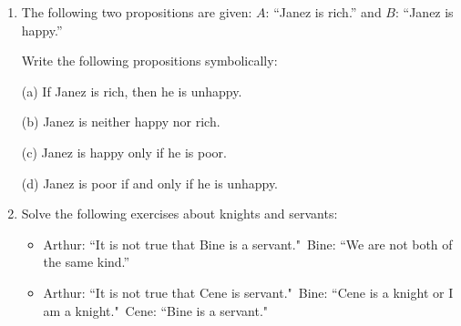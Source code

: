 \documentclass[11pt,paper=b5,footinclude,headinclude]{scrbook} %
\def\inn {{~\wedge~}}
\theoremstyle{remark}
\theoremstyle{definition} %
\theoremstyle{theorem} %
\begin{document}
\begin{enumerate}
(e) $\neg \neg A$

(f) $\neg (\neg A\inn \neg B)$

\medskip
\item
The following two propositions are given:
$A$: ``Janez is rich.'' and $B$: ``Janez is happy.''

Write the following propositions symbolically:

(a) If Janez is rich, then he is unhappy.

(b) Janez is neither happy nor rich.

(c) Janez is happy only if he is poor.

(d) Janez is poor if and only if he is unhappy.

\item Solve the following exercises about knights and servants:
\begin{itemize}
  \item Arthur: ``It is not true that Bine is a servant."~Bine: ``We are not both of the same kind.''
  \item Arthur: ``It is not true that Cene is servant."~Bine: ``Cene is a knight or I am a knight."~Cene: ``Bine is a servant."
\end{itemize}


\end{enumerate}
\end{document}
